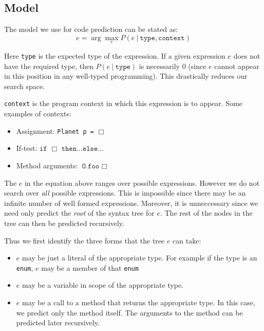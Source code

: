 \documentclass{article} %
\begin{document}
\subsection*{Model}
The model we use for code prediction can be stated as:
$$ e = \arg\max_e P(e ~|~ \texttt{type} , \texttt{context} ) $$

Here \texttt{type} is the expected type of the expression. If a given expression $e$ does not have the required type, then $P(e ~|~ \texttt{type})$ is necessarily $0$ (since $e$ cannot appear in this position in any well-typed programming). This drastically reduces our search space.

\texttt{context} is the program context in which this expression is to appear. Some examples of contexts:
\begin{itemize}
  \item Assignment: \texttt{Planet p =} $\Box$
  \item If-test: $\texttt{if }\Box\texttt{ then}\ldots\texttt{else}\ldots$
  \item Method arguments: $\texttt{O.foo }\Box$
\end{itemize}

The $e$ in the equation above ranges over possible expressions. However we do not search over \emph{all} possible expressions. This is impossible since there may be an infinite number of well formed expressions. Moreover, it is unneccessary since we need only predict the \emph{root} of the syntax tree for $e$. The rest of the nodes in the tree can then be predicted recursively.

Thus we first identify the three forms that the tree $e$ can take:
\begin{itemize}
  \item $e$ may be just a literal of the appropriate type. For example if the type is an \texttt{enum}, $e$ may be a member of that \texttt{enum}
  \item $e$ may be a variable in scope of the appropriate type.
  \item $e$ may be a call to a method that returns the appropriate type. In this case, we predict only the method itself. The arguments to the method can be predicted later recursively.
\end{itemize}
\end{document}
